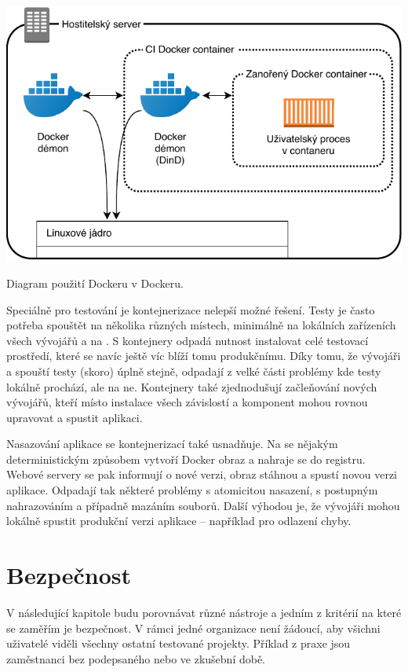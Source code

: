         \begin{iffigure}
            \centering
            \includegraphics[width=\textwidth]{media/dind-ci.pdf}
            \caption{Diagram použití Dockeru v Dockeru.}
            \label{fig:dind-ci}
        \end{iffigure}

        Speciálně pro testování je kontejnerizace nelepší možné řešení. Testy je často potřeba spouštět na několika různých místech, minimálně na lokálních zařízeních všech vývojářů a na \CI. S kontejnery odpadá nutnost instalovat celé testovací prostředí, které se navíc ještě víc blíží tomu produkčnímu. Díky tomu, že vývojáři a \CI spouští testy (skoro) úplně stejně, odpadají z velké části problémy kde testy lokálně prochází, ale na \CI ne. Kontejnery také zjednodušují začleňování nových vývojářů, kteří místo instalace všech závislostí a komponent mohou rovnou upravovat a spustit aplikaci.

        Nasazování aplikace se kontejnerizací také usnadňuje. Na \CI se nějakým deterministickým způsobem vytvoří Docker obraz a nahraje se do registru. Webové servery se pak informují o nové verzi, obraz stáhnou a spustí novou verzi aplikace. Odpadají tak některé problémy s atomicitou nasazení, s postupným nahrazováním a případně mazáním souborů. Další výhodou je, že vývojáři mohou lokálně spustit produkční verzi aplikace -- například pro odlazení chyby.

    \section{Bezpečnost}
        V následující kapitole budu porovnávat různé \CI nástroje a jedním z kritérií na které se zaměřím je bezpečnost. V rámci jedné organizace není žádoucí, aby všichni uživatelé viděli všechny ostatní testované projekty. Příklad z praxe jsou zaměstnanci bez podepsaného  nebo ve zkušební době.

